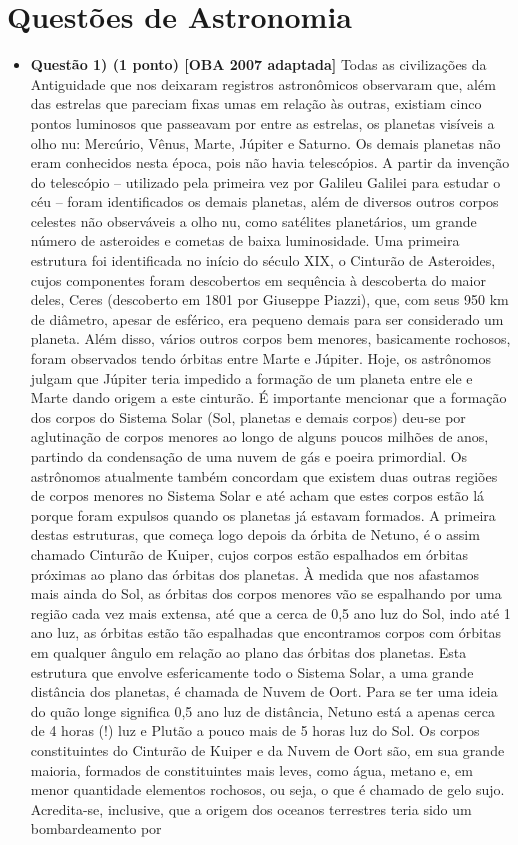 \documentclass[a4paper, 12pt]{article}
\begin{document}
    \section*{Questões de Astronomia}
        \begin{flushleft} \begin{itemize}
            \item \textbf{Questão 1) (1 ponto) [OBA 2007 adaptada]} Todas as civilizações da Antiguidade que nos deixaram registros astronômicos observaram que, além das estrelas que pareciam fixas umas em relação às outras, existiam cinco pontos luminosos que passeavam por entre as estrelas, os planetas visíveis a olho nu: Mercúrio, Vênus, Marte, Júpiter e Saturno. Os demais planetas não eram conhecidos nesta época, pois não havia telescópios. A partir da invenção do telescópio – utilizado pela primeira vez por Galileu Galilei para estudar o céu – foram identificados os demais planetas, além de diversos outros corpos celestes não observáveis a olho nu, como satélites planetários, um grande número de asteroides e cometas de baixa luminosidade. Uma primeira estrutura foi identificada no início do século XIX, o Cinturão de Asteroides, cujos componentes foram descobertos em sequência à descoberta do maior deles, Ceres (descoberto em 1801 por Giuseppe Piazzi), que, com seus 950 km de diâmetro, apesar de esférico, era pequeno demais para ser considerado um planeta. Além disso, vários outros corpos bem menores, basicamente rochosos, foram observados tendo órbitas entre Marte e Júpiter. Hoje, os astrônomos julgam que Júpiter teria impedido a formação de um planeta entre ele e Marte dando origem a este cinturão. É importante mencionar que a formação dos corpos do Sistema Solar (Sol, planetas e demais corpos) deu-se por aglutinação de corpos menores ao longo de alguns poucos milhões de anos, partindo da condensação de uma nuvem de gás e poeira primordial. Os astrônomos atualmente também concordam que existem duas outras regiões de corpos menores no Sistema Solar e até acham que estes corpos estão lá porque foram expulsos quando os planetas já estavam formados. A primeira destas estruturas, que começa logo depois da órbita de Netuno, é o assim chamado Cinturão de Kuiper, cujos corpos estão espalhados em órbitas próximas ao plano das órbitas dos planetas. À medida que nos afastamos mais ainda do Sol, as órbitas dos corpos menores vão se espalhando por uma região cada vez mais extensa, até que a cerca de 0,5 ano luz do Sol, indo até 1 ano luz, as órbitas estão tão espalhadas que encontramos corpos com órbitas em qualquer ângulo em relação ao plano das órbitas dos planetas. Esta estrutura que envolve esfericamente todo o Sistema Solar, a uma grande distância dos planetas, é chamada de Nuvem de Oort. Para se ter uma ideia do quão longe significa 0,5 ano luz de distância, Netuno está a apenas cerca de 4 horas (!) luz e Plutão a pouco mais de 5 horas luz do Sol. Os corpos constituintes do Cinturão de Kuiper e da Nuvem de Oort são, em sua grande maioria, formados de constituintes mais leves, como água, metano e, em menor quantidade elementos rochosos, ou seja, o que é chamado de gelo sujo. Acredita-se, inclusive, que a origem dos oceanos terrestres teria sido um bombardeamento por 
\end{itemize}
\end{flushleft}
\end{document}
